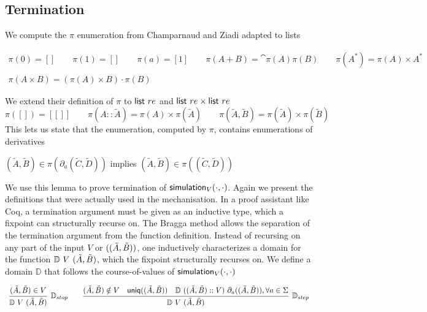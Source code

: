 \subsection{Termination}
We compute the $\pi$ enumeration from Champarnaud and Ziadi \cite{CZ01} adapted to lists
\begin{definition}[Enumeration]
  \begin{displaymath}
    \begin{array}{lll}
  \pi(0) = [] \qquad \pi(1) = [] \qquad \pi(a) = [1] \qquad \pi(A + B) = \cat{\pi(A)}{\pi(B)} \qquad \pi(A^*) =\pi(A) \times A^*  \\\\
  \pi(A \times B) = (\pi(A) \times B) \cdot \pi(B)  
    \end{array}
  \end{displaymath}

\end{definition}
We extend their definition of $\pi$ to $\mathsf{list}~re$ and $\mathsf{list}~re \times \mathsf{list}~re$
\[\pi([])=[[]] \qquad \pi(A::\tilde{A}) = \pi(A) \times \pi(\tilde{A}) \qquad \pi(\tilde{A},\tilde{B})= \pi(\tilde{A}) \times \pi(\tilde{B})\]
This lets us state that the enumeration, computed by $\pi$, contains enumerations of derivatives 
\begin{lemma}\label{lem:closure}
 $(\tilde{A},\tilde{B}) \in \pi(\partial_a(\tilde{C},\tilde{D}))$ implies  $(\tilde{A},\tilde{B}) \in \pi((\tilde{C},\tilde{D}))$ 
\end{lemma}
We use this lemma to prove termination of $\mathsf{simulation}_{V}(\cdot,\cdot)$. Again we present the definitions that were actually used in the mechanisation. In a proof assistant like Coq, a termination argument must be given as an inductive type, which a fixpoint can structurally recurse on. The Bragga method \cite{WMF21} allows the separation of the termination argument from the function definition. Instead of recursing on any part of the input $V$ or $((\tilde{A},\tilde{B}))$, one inductively characterizes a domain for the function $\mathbb{D}~V~(\tilde{A},\tilde{B})$, which the fixpoint structurally recurses on. We define a domain $\mathbb{D}$ that follows the course-of-values of $\mathsf{simulation}_{V}(\cdot,\cdot)$
\begin{definition}[Domain]
  \begin{displaymath}
    \begin{array}{lll}
      \infer[\mathbb{D}_{stop}]{\domm{V}{\pder{A}{B}}}{\pder{A}{B} \in V} \qquad \infer[\mathbb{D}_{step}]{\domm{V}{\pder{A}{B}}}{\pder{A}{B} \notin V & \mathsf{uniq}(\pder{A}{B}) & \domm{(\pder{A}{B}::V)}{\partial_a(\pder{A}{B})},\forall a \in \Sigma}
    \end{array}
  \end{displaymath}
\end{definition}
